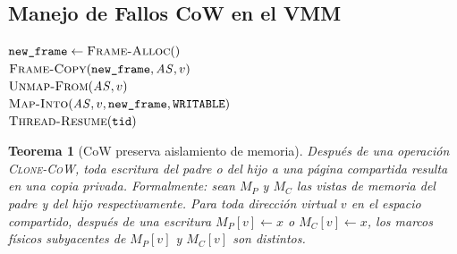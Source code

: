 \documentclass[11pt,twoside,openright]{book}
\theoremstyle{definition}
\theoremstyle{plain}
\newtheorem{theorem}{Teorema}[chapter]
\theoremstyle{remark}
\begin{document}
\subsection{Manejo de Fallos CoW en el VMM}

\begin{algorithm}[H]
\caption{\textsc{CoW-Fault-Handler}: Resolución de fallo de escritura CoW}
\label{alg:cow-fault}
$\texttt{new\_frame} \leftarrow \textsc{Frame-Alloc}()$ \\
$\textsc{Frame-Copy}(\texttt{new\_frame}, \mathit{AS}, v)$ \\
$\textsc{Unmap-From}(\mathit{AS}, v)$ \\
$\textsc{Map-Into}(\mathit{AS}, v, \texttt{new\_frame}, \texttt{WRITABLE})$ \\
$\textsc{Thread-Resume}(\texttt{tid})$
\end{algorithm}

\begin{theorem}[CoW preserva aislamiento de memoria]
\label{thm:cow-isolation}
Después de una operación \textsc{Clone-CoW}, toda escritura del padre o del hijo
a una página compartida resulta en una copia privada. Formalmente: sean
$M_P$ y $M_C$ las vistas de memoria del padre y del hijo respectivamente.
Para toda dirección virtual $v$ en el espacio compartido, después de una escritura
$M_P[v] \leftarrow x$ o $M_C[v] \leftarrow x$, los marcos físicos subyacentes
de $M_P[v]$ y $M_C[v]$ son distintos.
\end{theorem}
\end{document}
